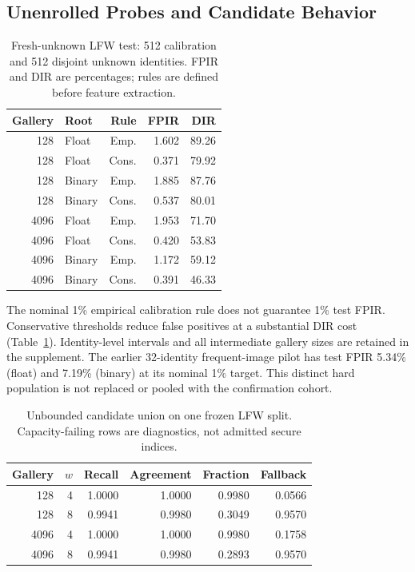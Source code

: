 \subsection{Unenrolled Probes and Candidate Behavior}

\begin{table}[t]
\caption{Fresh-unknown LFW test: 512 calibration and 512 disjoint unknown identities. FPIR and DIR are percentages; rules are defined before feature extraction.}
\label{tab:open}\centering\small
\setlength{\tabcolsep}{3pt}
\begin{tabular}{rlrrr}
\toprule
Gallery & Root & Rule & FPIR & DIR \\
\midrule
128 & Float & Emp. & 1.602 & 89.26 \\
128 & Float & Cons. & 0.371 & 79.92 \\
128 & Binary & Emp. & 1.885 & 87.76 \\
128 & Binary & Cons. & 0.537 & 80.01 \\
4096 & Float & Emp. & 1.953 & 71.70 \\
4096 & Float & Cons. & 0.420 & 53.83 \\
4096 & Binary & Emp. & 1.172 & 59.12 \\
4096 & Binary & Cons. & 0.391 & 46.33 \\
\bottomrule
\end{tabular}
\end{table}

The nominal 1\% empirical calibration rule does not guarantee 1\% test FPIR. Conservative thresholds reduce false positives at a substantial DIR cost (Table~\ref{tab:open}). Identity-level intervals and all intermediate gallery sizes are retained in the supplement. The earlier 32-identity frequent-image pilot has test FPIR 5.34\% (float) and 7.19\% (binary) at its nominal 1\% target. This distinct hard population is not replaced or pooled with the confirmation cohort.

\begin{table}[t]
\caption{Unbounded candidate union on one frozen LFW split. Capacity-failing rows are diagnostics, not admitted secure indices.}
\label{tab:index}\centering\small
\setlength{\tabcolsep}{3pt}
\begin{tabular}{rrrrrr}
\toprule
Gallery & $w$ & Recall & Agreement & Fraction & Fallback \\
\midrule
128 & 4 & 1.0000 & 1.0000 & 0.9980 & 0.0566 \\
128 & 8 & 0.9941 & 0.9980 & 0.3049 & 0.9570 \\
4096 & 4 & 1.0000 & 1.0000 & 0.9980 & 0.1758 \\
4096 & 8 & 0.9941 & 0.9980 & 0.2893 & 0.9570 \\
\bottomrule
\end{tabular}
\end{table}

